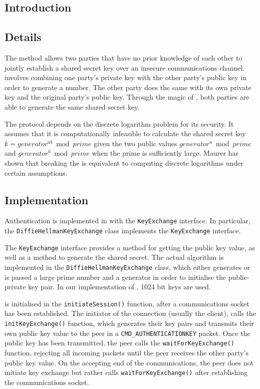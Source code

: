 \documentclass[a4paper,11pt]{article}
\begin{document}
\subsection{Introduction}

\subsection{Details}
The  method allows two parties that have 
no prior knowledge of each other to jointly establish a shared secret key over 
an insecure communications channel.  
involves combining one party's private key with the other party's public key in 
order to generate a number. The other party does the same with its own private 
key and the original party's public key. Through the magic of 
, both parties are able to generate the same shared 
secret key.

The protocol depends on the discrete logarithm problem for its security. It 
assumes that it is computationally infeasible to calculate the shared secret key
$k = generator^{ab} \bmod prime$ given the two public values 
$generator^{a} \bmod prime$ and $generator^{b} \bmod prime$ when the prime is 
sufficiently large. Maurer has shown that breaking the 
 is equivalent to computing discrete 
logarithms under certain assumptions.

\subsection{Implementation}
Authentication is implemented in \packageName{} with the 
\verb+KeyExchange+ interface. In particular, the \verb+DiffieHellmanKeyExchange+
class implements the \verb+KeyExchange+ interface.

The \verb+KeyExchange+ interface provides a method for getting the public key
value, as well as a method to generate the shared secret. The actual 
 algorithm is implemented in the 
\verb+DiffieHellmanKeyExchange+ class, which either generates or is passed a 
large prime number and a generator in order to initialise the 
 public-private key pair. In our implementation of 
, 1024 bit keys are used.

 is initialised in the 
\verb+initiateSession()+ function, after a communications socket has been 
established. The initiator of the connection (usually the client), calls the
\verb+initKeyExchange()+ function, which generates their 
 key pairs and transmits their own public key value to
the peer in a \verb+CMD_AUTHENTICATIONKEY+ packet. Once the public key has been 
transmitted, the \serviceName{} peer calls the \verb+waitForKeyExchange()+ 
function, rejecting all incoming packets until the peer receives the other
party's public key value. On the accepting end of the communications, the peer
does not initiate key exchange but rather calls \verb+waitForKeyExchange()+ 
after establishing the communications socket.
\end{document}
